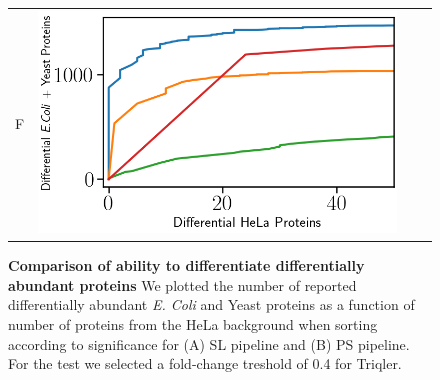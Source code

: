 \documentclass[11pt]{article}
\begin{document}
\begin{figure}[hbt]
\begin{tabular}{lclc}
        F & \includegraphics[width=0.45\linewidth]{../../result/report_plots_filtered/diann_de_human_vs_ecoli_and_yeast.png} \\ 

    \end{tabular}
    \caption{{\bf Comparison of ability to differentiate differentially abundant proteins} We plotted the number of reported differentially abundant  {\em E. Coli} and Yeast proteins as a function of number of proteins from the HeLa background when sorting according to significance for (A) SL pipeline and (B) PS pipeline. For the test we selected a fold-change treshold of 0.4 for Triqler. \label{fig:ability_to_differentiate_differentially_abundant_specie_vs_hela}}
\end{figure}
\end{document}
